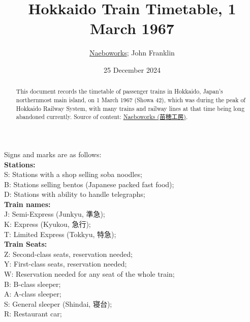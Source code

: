 \documentclass{article}
\title{Hokkaido Train Timetable, 1 March 1967}
\author{\href{http://naeboworks.com/haisen/timetable.htm}{Naeboworks}; John Franklin}
\date{25 December 2024}
\begin{document}
	\sffamily
	\maketitle 
	\begin{abstract}
		This document records the timetable of passenger trains in Hokkaido, Japan's northernmost main island, on 1 March 1967 (Showa 42), which was during the peak of Hokkaido Railway System, with many trains and railway lines at that time being long abandoned currently. Source of content: \href{http://naeboworks.com/haisen/timetable.htm}{Naeboworks (苗穂工房)}.
	\end{abstract}
	\par 
	Signs and marks are as follows: \\
	\textbf{Stations: }\\
	S: Stations with a shop selling soba noodles; \\
	B: Stations selling bentos (Japanese packed fast food); \\
	D: Stations with ability to handle telegraphs; \\
	\textbf{Train names: }\\
	J: Semi-Express (Junkyu, 準急); \\
	K: Express (Kyukou, 急行); \\
	T: Limited Express (Tokkyu, 特急); \\
	\textbf{Train Seats: }\\
	Z: Second-class seats, reservation needed; \\
	Y: First-class seats, reservation needed; \\
	W: Reservation needed for any seat of the whole train; \\
	B: B-class sleeper; \\
	A: A-class sleeper; \\
	S: General sleeper (Shindai, 寝台); \\
	R: Restaurant car; \\
\end{document}
